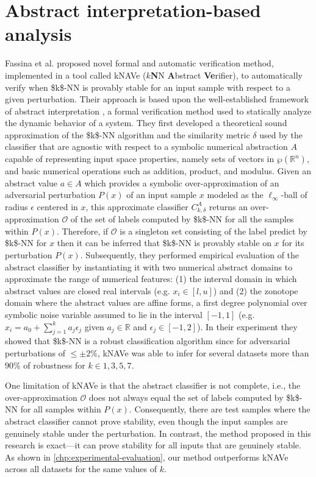 \section {Abstract interpretation-based analysis}
\label{sec:Abstract-analysis}
Fassina et al. \cite{Nicolo-knn} proposed novel formal and automatic verification method, implemented in a tool called kNAVe ($k$\textbf{N}N \textbf{A}bstract \textbf{Ve}rifier), to automatically verify when \acs{$k$-NN} is provably stable for an input sample with respect to a given perturbation. Their approach is based upon the well-established framework of abstract interpretation \cite{cousot21}, a formal verification method used to statically analyze the dynamic behavior of a system. They first developed a theoretical sound approximation of the \acs{$k$-NN} algorithm and the similarity metric $\delta$ used by the classifier that are agnostic with respect to a symbolic numerical abstraction $A$ capable of representing input space properties, namely sets of vectors in $\wp(\mathbb{R}^n)$, and basic numerical operations such as addition, product, and modulus. Given an abstract value $a \in A$ which provides a symbolic over-approximation of an adversarial perturbation $P(x)$ of an input sample $x$ modeled as the $\ell_\infty$-ball of radius $\epsilon$ centered in $x$, this approximate classifier $C_{k,\delta}^A$ returns an over-approximation $\mathcal{O}$ of the set of labels computed by \acs{$k$-NN} for all the samples within $P(x)$. Therefore, if $\mathcal{O}$ is a singleton set consisting of the label predict by \acs{$k$-NN} for $x$ then it can be inferred that \acs{$k$-NN} is provably stable on $x$ for its perturbation $P(x)$. Subsequently, they performed empirical evaluation of the abstract classifier by instantiating it with two numerical abstract domains to approximate the range of numerical features: (1) the interval domain \cite{CC77} in which abstract values are closed real intervals (e.g. $x_i \in [l, u]$) and (2) the zonotope domain \cite{Comba1990AaneAA} where the abstract values are affine forms, a first degree polynomial over symbolic noise variable assumed to lie in the interval $[-1, 1]$ (e.g. $x_i = a_0 + \sum_{j=1}^{k} a_j\epsilon_j$ given $a_j \in \mathbb{R}$ and $\epsilon_j \in [-1, 2]$). In their experiment they showed that \acs{$k$-NN} is a robust classification algorithm since for adversarial perturbations of $\le \pm 2\% $, kNAVe was able to infer for several datasets more than $90\%$ of robustness for $k \in {1, 3, 5, 7}$.

One limitation of kNAVe is that the abstract classifier is not complete, i.e., the over-approximation $\mathcal{O}$ does not always equal the set of labels computed by \acs{$k$-NN} for all samples within $P(x)$. Consequently, there are test samples where the abstract classifier cannot prove stability, even though the input samples are genuinely stable under the perturbation. In contrast, the method proposed in this research is exact—it can prove stability for all inputs that are genuinely stable. As shown in \autoref{chp:experimental-evaluation}, our method outperforms kNAVe across all datasets for the same values of $k$.

\label{sec:abs-inter-ver}


